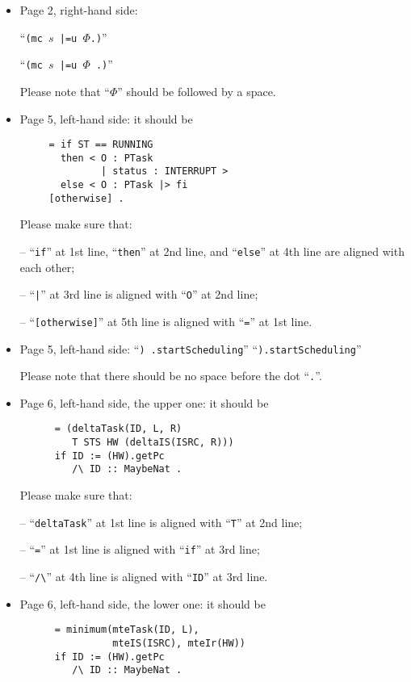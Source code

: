\documentclass[12pt,onecolumn]{IEEEtranTIE}
\begin{document}
\medskip
\begin{itemize}\setlength{\itemsep}{10pt}

\item Page 2, right-hand side:

``\verb|(mc |$s$\verb+ |=u +$\Phi$\verb|.)|'' 

\by

``\verb|(mc |$s$\verb+ |=u +$\Phi$\verb| .)|''

Please note that ``$\Phi$'' should be followed by a space.


\item Page 5, left-hand side: it should be
\begin{verbatim}
     = if ST == RUNNING 
       then < O : PTask 
              | status : INTERRUPT >
       else < O : PTask |> fi 
     [otherwise] .
\end{verbatim}

Please make sure that: 

-- ``\verb|if|'' at 1st line, ``\verb|then|'' at 2nd line, and
``\verb|else|'' at 4th line are aligned with each other;

-- ``\verb+|+'' at 3rd line is aligned with ``\verb|O|'' at 2nd line; 

-- ``\verb|[otherwise]|'' at 5th line is aligned with ``\verb|=|'' at
1st line.


\item Page 5, left-hand side: ``\verb|) .startScheduling|'' \by
  ``\verb|).startScheduling|''

Please note that there should be no space before the dot ``\verb|.|''.


\item Page 6, left-hand side, the upper one: it should be
\begin{verbatim}
      = (deltaTask(ID, L, R) 
         T STS HW (deltaIS(ISRC, R)))
      if ID := (HW).getPc 
         /\ ID :: MaybeNat .
\end{verbatim}

Please make sure that:

-- ``\verb|deltaTask|'' at 1st line is aligned with ``\verb|T|'' at
2nd line;

-- ``\verb|=|'' at 1st line is aligned with ``\verb|if|'' at 3rd line;

-- ``\verb|/\|'' at 4th line is aligned with ``\verb|ID|'' at 3rd
line.


\item Page 6, left-hand side, the lower one: it should be
\begin{verbatim}
      = minimum(mteTask(ID, L),
                mteIS(ISRC), mteIr(HW))
      if ID := (HW).getPc 
         /\ ID :: MaybeNat .
\end{verbatim}


\end{itemize}
\end{document}
